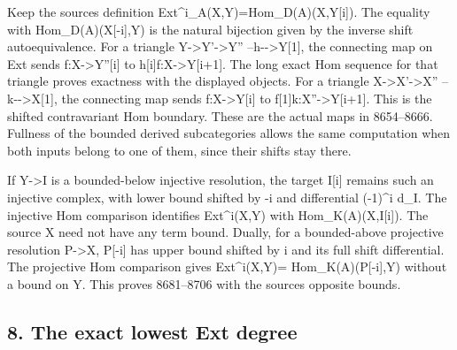 \documentclass[11pt]{article}
\begin{document}
Keep the source\textquotesingle s definition Ext\textasciicircum{}i\_\allowbreak{}A(X,\allowbreak{}Y)\allowbreak{}\allowbreak{}=Hom\_\allowbreak{}D(A)\allowbreak{}(X,\allowbreak{}Y[i]\allowbreak{})\allowbreak{}. The equality with Hom\_\allowbreak{}D(A)\allowbreak{}(X[-i]\allowbreak{},\allowbreak{}Y)\allowbreak{} is the natural bijection given by the inverse shift autoequivalence. For a triangle Y\allowbreak{}->Y'\allowbreak{}->Y'' --h-\allowbreak{}->Y[1]\allowbreak{},\allowbreak{} the connecting map on Ext sends f:\allowbreak{}X\allowbreak{}->Y''[i]\allowbreak{} to h[i]\allowbreak{}f:\allowbreak{}X\allowbreak{}->Y[i\allowbreak{}+1]\allowbreak{}. The long exact Hom sequence for that triangle proves exactness with the displayed objects. For a triangle X\allowbreak{}->X'\allowbreak{}->X'' --k-\allowbreak{}->X[1]\allowbreak{},\allowbreak{} the connecting map sends f:\allowbreak{}X\allowbreak{}->Y[i]\allowbreak{} to f[1]\allowbreak{}k:\allowbreak{}X''\allowbreak{}->Y[i\allowbreak{}+1]\allowbreak{}. This is the shifted contravariant Hom boundary. These are the actual maps in 8654–\allowbreak{}8666. Fullness of the bounded derived subcategories allows the same computation when both inputs belong to one of them,\allowbreak{} since their shifts stay there.

If Y\allowbreak{}->I is a bounded-below injective resolution,\allowbreak{} the target I[i]\allowbreak{} remains such an injective complex,\allowbreak{} with lower bound shifted by -i and differential (-1)\allowbreak{}\textasciicircum{}i d\_\allowbreak{}I. The injective Hom comparison identifies Ext\textasciicircum{}i(X,\allowbreak{}Y)\allowbreak{} with Hom\_\allowbreak{}K(A)\allowbreak{}(X,\allowbreak{}I[i]\allowbreak{})\allowbreak{}. The source X need not have any term bound. Dually,\allowbreak{} for a bounded-above projective resolution P\allowbreak{}->X,\allowbreak{} P[-i]\allowbreak{} has upper bound shifted by i and its full shift differential. The projective Hom comparison gives Ext\textasciicircum{}i(X,\allowbreak{}Y)\allowbreak{}\allowbreak{}= Hom\_\allowbreak{}K(A)\allowbreak{}(P[-i]\allowbreak{},\allowbreak{}Y)\allowbreak{} without a bound on Y. This proves 8681–\allowbreak{}8706 with the source\textquotesingle s opposite bounds.

\subsection{8. The exact lowest Ext degree}\label{proofs-8352-8772-the-exact-lowest-ext-degree}
\end{document}
